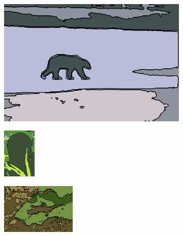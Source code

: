 \documentclass[journal]{IEEEtran}
\begin{document}
\begin{figure}[!ht]
    \begin{subfigure}[t]{\textwidth+20pt\relax}
    	\centering
    	\includegraphics[width=\dimexpr\linewidth-20pt\relax]{100007_Birch_const_segm} 
    \end{subfigure}      
    \begin{subfigure}[b]{0.23\textwidth}
    	\centering
        \includegraphics[height=67.68857pt]{101084_Birch_const_segm}
    \end{subfigure}
    \begin{subfigure}[b]{0.23\textwidth}
    	\centering
        \includegraphics[height=67.68857pt]{175083_Birch_const_segm}
    \end{subfigure}

\end{figure}
\end{document}

